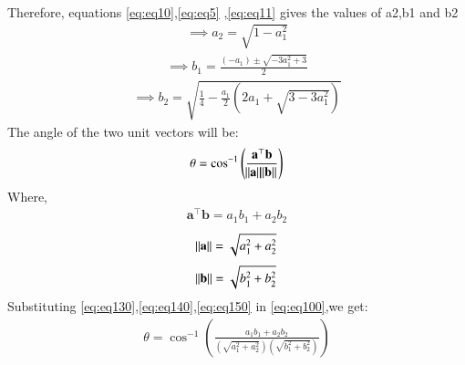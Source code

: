 \documentclass[12pt,-letter paper]{article}
\let\vec\mathbf{}
\let\vec\mathbf{}
\let\vec\mathbf{}
\providecommand{\brak}[1]{\ensuremath{\left(#1\right)}}
\providecommand{\brak}[1]{\ensuremath{\left(#1\right)}}
\begin{document}
\begin{enumerate}
\begin{align}
     \end{align}
       Therefore, equations \eqref{eq:eq10},\eqref{eq:eq5} ,\eqref{eq:eq11} gives the values of a2,b1 and b2 
      \begin{align}
 \implies   a_2 = \sqrt{1-a_1^2}
     \end{align}
   \begin{align}
\implies  b_1 = \frac{ (-a_1)\pm \sqrt{-3a_1^2+3}}{2}
  \end{align}  
  \begin{align}
   \implies b_2= \sqrt{\frac{1}{4}-\frac{a_1}{2}\brak{2a_1+\sqrt{3-3a_1^2}}}
      \end{align}
      The angle of the two unit vectors will be:
      \begin{align}
         \theta = \cos^{-1}\brak{{\frac{\vec{a}^{\top}\vec{b}}{{\norm{\vec{a}}}{\norm{\vec{b}}}}}}
         \label{eq:eq100}
      \end{align}
      Where,
       \begin{align}
      \vec{a}^{\top}\vec{b}=a_1b_1 +a_2b_2
      \label{eq:eq130}
       \end{align}
        \begin{align}
      \norm{\vec{a}} = \sqrt{a_1^2+a_2^2}
       \label{eq:eq140}
       \end{align}
        \begin{align}
      \norm{\vec{b}} = \sqrt{b_1^2+b_2^2}
       \label{eq:eq150}
       \end{align}
       Substituting \eqref{eq:eq130},\eqref{eq:eq140},\eqref{eq:eq150} in \eqref{eq:eq100},we get:
       \begin{align}
    \theta = \cos^{-1}\brak{{\frac{a_1b_1+a_2b_2}{\brak{\sqrt{a_1^2+a_2^2}}{\brak{\sqrt{b_1^2+b_2^2}}}}}}
      \end{align}
  \end{enumerate}
\end{document}

